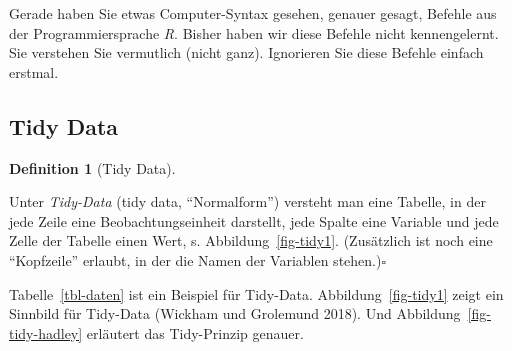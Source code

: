 \documentclass[
  a4paper,
  DIV=11]{scrreprt}
\theoremstyle{definition}
\theoremstyle{definition}
\theoremstyle{definition}
\newtheorem{definition}{Definition}[chapter]
\theoremstyle{remark}
\begin{document}
\begin{tcolorbox}[enhanced jigsaw, leftrule=.75mm, opacitybacktitle=0.6, colback=white, colframe=quarto-callout-tip-color-frame, coltitle=black, colbacktitle=quarto-callout-tip-color!10!white, opacityback=0, left=2mm, breakable, titlerule=0mm, toptitle=1mm, bottomtitle=1mm, rightrule=.15mm, title=\textcolor{quarto-callout-tip-color}{\faLightbulb}\hspace{0.5em}{Tipp}, arc=.35mm, bottomrule=.15mm, toprule=.15mm]

Gerade haben Sie etwas Computer-Syntax gesehen, genauer gesagt, Befehle
aus der Programmiersprache \emph{R}. Bisher haben wir diese Befehle
nicht kennengelernt. Sie verstehen Sie vermutlich (nicht ganz).
Ignorieren Sie diese Befehle einfach erstmal.

\end{tcolorbox}

\subsection{Tidy Data}\label{tidy-data}

\begin{definition}[Tidy
Data]\protect\hypertarget{def-tidy}{}\label{def-tidy}

Unter \emph{Tidy-Data} (tidy data, ``Normalform'') versteht man eine
Tabelle, in der jede Zeile eine Beobachtungseinheit darstellt, jede
Spalte eine Variable und jede Zelle der Tabelle einen Wert, s.
Abbildung~\ref{fig-tidy1}. (Zusätzlich ist noch eine ``Kopfzeile''
erlaubt, in der die Namen der Variablen stehen.)\(\square\)

\end{definition}

Tabelle~\ref{tbl-daten} ist ein Beispiel für Tidy-Data.
Abbildung~\ref{fig-tidy1} zeigt ein Sinnbild für Tidy-Data (Wickham und
Grolemund 2018). Und Abbildung~\ref{fig-tidy-hadley} erläutert das
Tidy-Prinzip genauer.
\end{document}
